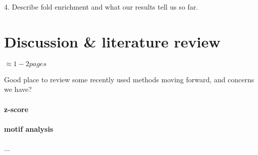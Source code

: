 \documentclass{article}
\newcommand{\beginsupplement}{%
        \setcounter{table}{0}
        \renewcommand{\thetable}{S\arabic{table}}%
        \setcounter{figure}{0}
        \renewcommand{\thefigure}{S\arabic{figure}}%
     }
\begin{document}
4. Describe fold enrichment and what our results tell us so far.

\section*{Discussion \& literature review}

$\approx 1-2 pages$

Good place to review some recently used methods moving forward, and concerns we have?

\paragraph{z-score}

\paragraph{motif analysis}

...





\end{document}

